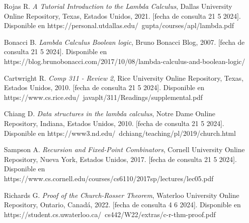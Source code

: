 \begin{thebibliography}{11}
     \bibitem{}
    \label{sec:109}
    \hypertarget{109}{}
    Rojas R. \textit{A Tutorial Introduction to the Lambda Calculus}, Dallas University Online Repository, Texas, Estados Unidos, 2021.  [fecha de consulta 21 5 2024]. Disponible en https://personal.utdallas.edu/~gupta/courses/apl/lambda.pdf

     \bibitem{}
    \label{sec:110}
    \hypertarget{110}{}
    Bonacci B. \textit{Lambda Calculus Boolean logic}, Bruno Bonacci Blog, 2007.  [fecha de consulta 21 5 2024]. Disponible en https://blog.brunobonacci.com/2017/10/08/lambda-calculus-and-boolean-logic/

     \bibitem{}
    \label{sec:111}
    \hypertarget{111}{}
    Cartwright R. \textit{Comp 311 - Review 2}, Rice University Online Repository, Texas, Estados Unidos, 2010.  [fecha de consulta 21 5 2024]. Disponible en https://www.cs.rice.edu/~javaplt/311/Readings/supplemental.pdf

     \bibitem{}
    \label{sec:112}
    \hypertarget{112}{}
    Chiang D. \textit{Data structures in the lambda calculus}, Notre Dame Online Repository, Indiana, Estados Unidos, 2010.  [fecha de consulta 21 5 2024]. Disponible en https://www3.nd.edu/~dchiang/teaching/pl/2019/church.html

     \bibitem{}
    \label{sec:113}
    \hypertarget{113}{}
    Sampson A. \textit{Recursion and Fixed-Point Combinators}, Cornell University Online Repository, Nueva York, Estados Unidos, 2017.  [fecha de consulta 21 5 2024]. Disponible en https://www.cs.cornell.edu/courses/cs6110/2017sp/lectures/lec05.pdf

     \bibitem{}
    \label{sec:114}
    \hypertarget{114}{}
    Richards G. \textit{Proof of the Church-Rosser Theorem}, Waterloo University Online Repository, Ontario, Canadá, 2022.  [fecha de consulta 4 6 2024]. Disponible en https://student.cs.uwaterloo.ca/~cs442/W22/extras/c-r-thm-proof.pdf



\end{thebibliography}